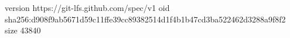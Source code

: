 version https://git-lfs.github.com/spec/v1
oid sha256:d908f9ab5671d59c11ffe39cc89382514d1f4b1b47cd3ba522462d3288a9f8f2
size 43840
